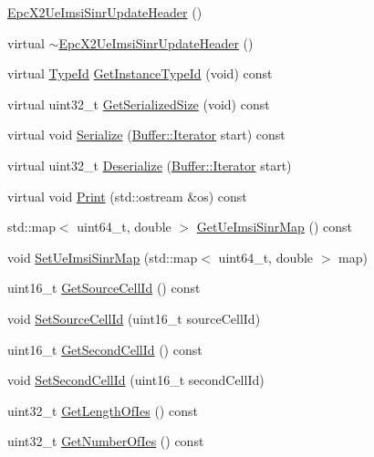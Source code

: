 \begin{DoxyCompactItemize}
\item 
\hyperlink{classns3_1_1EpcX2UeImsiSinrUpdateHeader_a5afa165df0fbba055c698776101e247a}{Epc\+X2\+Ue\+Imsi\+Sinr\+Update\+Header} ()
\item 
virtual \hyperlink{classns3_1_1EpcX2UeImsiSinrUpdateHeader_a4a3041c43c40dcc784d4fbfe00c98f35}{$\sim$\+Epc\+X2\+Ue\+Imsi\+Sinr\+Update\+Header} ()
\item 
virtual \hyperlink{classns3_1_1TypeId}{Type\+Id} \hyperlink{classns3_1_1EpcX2UeImsiSinrUpdateHeader_af59e387276ff548a3948f944610a1ab6}{Get\+Instance\+Type\+Id} (void) const 
\item 
virtual uint32\+\_\+t \hyperlink{classns3_1_1EpcX2UeImsiSinrUpdateHeader_a1824b8f10249866def440438b573ce17}{Get\+Serialized\+Size} (void) const 
\item 
virtual void \hyperlink{classns3_1_1EpcX2UeImsiSinrUpdateHeader_ae706bd37c99c4e8d7aae47c4fb2b2b48}{Serialize} (\hyperlink{classns3_1_1Buffer_1_1Iterator}{Buffer\+::\+Iterator} start) const 
\item 
virtual uint32\+\_\+t \hyperlink{classns3_1_1EpcX2UeImsiSinrUpdateHeader_a38f91452859d0982b1036c144dd92e8f}{Deserialize} (\hyperlink{classns3_1_1Buffer_1_1Iterator}{Buffer\+::\+Iterator} start)
\item 
virtual void \hyperlink{classns3_1_1EpcX2UeImsiSinrUpdateHeader_a418c0cd105d798a45915262e2c40b55c}{Print} (std\+::ostream \&os) const 
\item 
std\+::map$<$ uint64\+\_\+t, double $>$ \hyperlink{classns3_1_1EpcX2UeImsiSinrUpdateHeader_a68196170e76ea4b43e4bf687d1f1e82d}{Get\+Ue\+Imsi\+Sinr\+Map} () const 
\item 
void \hyperlink{classns3_1_1EpcX2UeImsiSinrUpdateHeader_ac9d5f4ed54b7f2e44e4b29a6c527fa20}{Set\+Ue\+Imsi\+Sinr\+Map} (std\+::map$<$ uint64\+\_\+t, double $>$ map)
\item 
uint16\+\_\+t \hyperlink{classns3_1_1EpcX2UeImsiSinrUpdateHeader_a8bd6fdf3b2491f23e84fbff79ba5c9c9}{Get\+Source\+Cell\+Id} () const 
\item 
void \hyperlink{classns3_1_1EpcX2UeImsiSinrUpdateHeader_ae720c9551c2a854cbafca3f00a215776}{Set\+Source\+Cell\+Id} (uint16\+\_\+t source\+Cell\+Id)
\item 
uint16\+\_\+t \hyperlink{classns3_1_1EpcX2UeImsiSinrUpdateHeader_af1056fc6e46c91cbd99d75d212c29c94}{Get\+Second\+Cell\+Id} () const 
\item 
void \hyperlink{classns3_1_1EpcX2UeImsiSinrUpdateHeader_ac926989344bd1608199c690ac8ff639c}{Set\+Second\+Cell\+Id} (uint16\+\_\+t second\+Cell\+Id)
\item 
uint32\+\_\+t \hyperlink{classns3_1_1EpcX2UeImsiSinrUpdateHeader_a0156492bce79a01c7121f68a91ba6e18}{Get\+Length\+Of\+Ies} () const 
\item 
uint32\+\_\+t \hyperlink{classns3_1_1EpcX2UeImsiSinrUpdateHeader_a54341b4883e93e8355cf6a08523f008d}{Get\+Number\+Of\+Ies} () const 
\end{DoxyCompactItemize}
